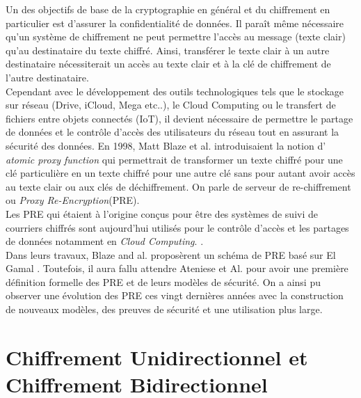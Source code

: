 \documentclass[twoside,french,11pt]{amsart}
\begin{document}
Un des objectifs de base de la cryptographie en général et du chiffrement en particulier est d'assurer la confidentialité de données. Il paraît même nécessaire qu'un système de chiffrement ne peut permettre l'accès au message (texte clair) qu'au destinataire du texte chiffré. Ainsi, transférer le texte clair à un autre destinataire nécessiterait un accès au texte clair et à la clé de chiffrement de l'autre destinataire.\\
Cependant avec le développement des outils technologiques tels que le stockage sur réseau (Drive, iCloud, Mega etc..), le Cloud Computing ou le transfert de fichiers entre objets connectés (IoT), il devient nécessaire de permettre le partage de données et le contrôle d'accès des utilisateurs du réseau tout en assurant la sécurité des données. En 1998, Matt Blaze et al. \cite{Blaze98} introduisaient la notion d' \textit{atomic proxy function} qui permettrait de transformer un texte chiffré pour une clé particulière en un texte chiffré pour une autre clé sans pour autant avoir accès au texte clair ou aux clés de déchiffrement. On parle de serveur de re-chiffrement ou \textit{Proxy Re-Encryption}(PRE).\\

Les PRE qui étaient à l'origine conçus pour être des systèmes de suivi de courriers chiffrés sont aujourd'hui utilisés pour le contrôle d'accès et les partages de données notamment en \textit{Cloud Computing}. \cite{devigne:tel-01081377} \cite{ateniese2006improved}
\cite{liu2020development}. \\
Dans leurs travaux, Blaze and al. \cite{Blaze98} proposèrent un schéma de PRE basé sur El Gamal \cite{elgamal1985public}. Toutefois, il aura fallu attendre Ateniese et Al. \cite{ateniese2006improved} pour avoir une première définition formelle des PRE et de leurs modèles de sécurité. On a ainsi pu observer une évolution des PRE ces vingt dernières années avec la construction de nouveaux modèles, des preuves de sécurité et une utilisation plus large.
\section{Chiffrement Unidirectionnel et Chiffrement Bidirectionnel}
\end{document}
